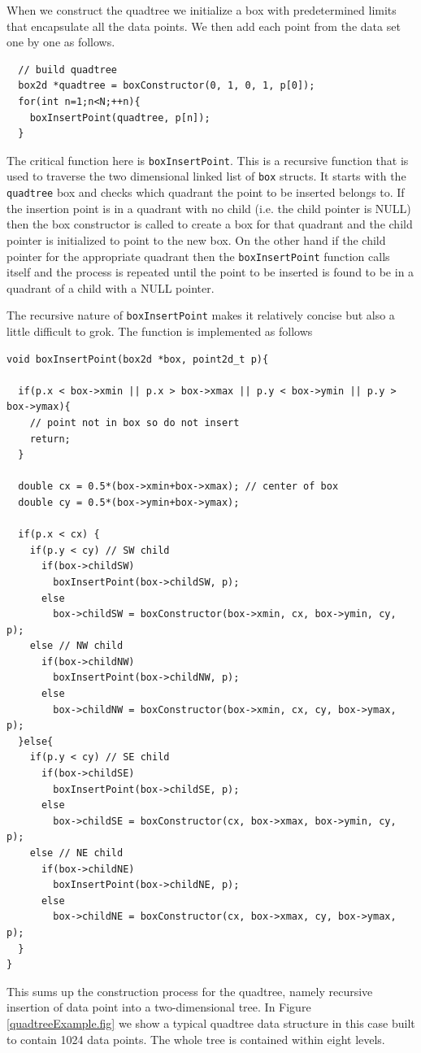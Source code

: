 When we construct the quadtree we initialize a box with predetermined limits that encapsulate all the data points. We then add each point from the data set one by one as follows.
\begin{verbatim}
  // build quadtree   
  box2d *quadtree = boxConstructor(0, 1, 0, 1, p[0]);
  for(int n=1;n<N;++n){
    boxInsertPoint(quadtree, p[n]);
  }
\end{verbatim}
The critical function here is \texttt{boxInsertPoint}. This is a recursive function that is used to traverse the two dimensional linked list of \texttt{box} structs. It starts with the \texttt{quadtree} box and checks which quadrant the point to be inserted belongs to. If the insertion point is in a quadrant with no child (i.e. the child pointer is NULL) then the box constructor is called to create a box for that quadrant and the child pointer is initialized to point to the new box. On the other hand if the child pointer for the appropriate quadrant then the \texttt{boxInsertPoint} function calls itself and the process is repeated until the point to be inserted is found to be in a quadrant of a child with a NULL pointer. 

The recursive nature of \texttt{boxInsertPoint} makes it relatively concise but also a little difficult to grok. The function is implemented as follows
\begin{verbatim}
void boxInsertPoint(box2d *box, point2d_t p){

  if(p.x < box->xmin || p.x > box->xmax || p.y < box->ymin || p.y > box->ymax){
    // point not in box so do not insert                
    return;
  }

  double cx = 0.5*(box->xmin+box->xmax); // center of box   
  double cy = 0.5*(box->ymin+box->ymax);

  if(p.x < cx) {
    if(p.y < cy) // SW child   
      if(box->childSW)
        boxInsertPoint(box->childSW, p);
      else
        box->childSW = boxConstructor(box->xmin, cx, box->ymin, cy, p);
    else // NW child     
      if(box->childNW)
        boxInsertPoint(box->childNW, p);
      else
        box->childNW = boxConstructor(box->xmin, cx, cy, box->ymax, p);
  }else{
    if(p.y < cy) // SE child  
      if(box->childSE)
        boxInsertPoint(box->childSE, p);
      else
        box->childSE = boxConstructor(cx, box->xmax, box->ymin, cy, p);
    else // NE child   
      if(box->childNE)
        boxInsertPoint(box->childNE, p);
      else
        box->childNE = boxConstructor(cx, box->xmax, cy, box->ymax, p);
  }
}
\end{verbatim}
This sums up the construction process for the quadtree, namely recursive insertion of data point into a two-dimensional tree. In Figure \ref{quadtreeExample.fig} we show a typical quadtree data structure in this case built to contain 1024 data points. The whole tree is contained within eight levels.


